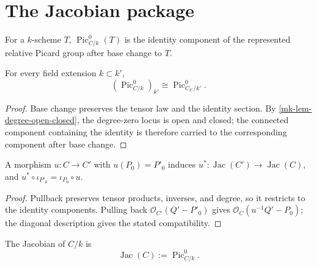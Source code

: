 \chapter{The Jacobian package}
\label{mk-ch-jacobian}

\begin{definition}
  \label{mk-def-pic0-functor}
  \cite{kleiman-picard}
  For a \(k\)-scheme \(T\), \(\operatorname{Pic}^0_{C/k}(T)\) is the
  identity component of the represented relative Picard group after base
  change to \(T\).
\end{definition}

\begin{lemma}
  \label{mk-lem-pic0-base-change}
  \cite{kleiman-picard}
  For every field extension \(k\subset k'\),
  \[
    (\operatorname{Pic}^0_{C/k})_{k'}\cong
    \operatorname{Pic}^0_{C_{k'}/k'}.
  \]
\end{lemma}

\begin{proof}
  Base change preserves the tensor law and the identity section.  By
  \ref{mk-lem-degree-open-closed}, the degree-zero locus is open and closed;
  the connected component containing the identity is therefore carried to
  the corresponding component after base change.
\end{proof}

\begin{proposition}
  \label{mk-prop-jacobian-functorial}
  \cite{milne-av}
  A morphism \(u:C\to C'\) with \(u(P_0)=P'_0\) induces
  \(u^*:\operatorname{Jac}(C')\to\operatorname{Jac}(C)\), and
  \(u^*\circ\iota_{P'_0}=\iota_{P_0}\circ u\).
\end{proposition}

\begin{proof}
  Pullback preserves tensor products, inverses, and degree, so it restricts to
  the identity components.  Pulling back
  \(\mathcal O_{C'}(Q'-P'_0)\) gives
  \(\mathcal O_C(u^{-1}Q'-P_0)\); the diagonal description gives the stated
  compatibility.
\end{proof}

\begin{definition}[Jacobian]
  \label{mk-def-jacobian}
  \cite{milne-av,kleiman-picard}
  The Jacobian of \(C/k\) is
  \[
    \operatorname{Jac}(C):=\operatorname{Pic}^0_{C/k}.
  \]
\end{definition}

